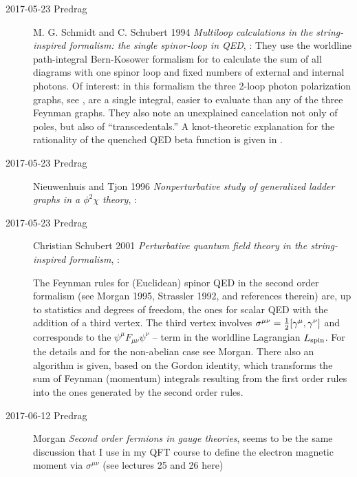\begin{description}
\item[2017-05-23 Predrag]
 \label{sect:SchSch96}
M. G. Schmidt and C. Schubert 1994
{\em Multiloop calculations in the string-inspired formalism: the single
spinor-loop in QED}, :
They use the worldline path-integral Bern-Kosower formalism
for to calculate the sum of all diagrams
with one spinor loop and fixed numbers of external and internal photons.
Of interest: in this formalism the three 2-loop photon polarization graphs,
see ,
are a single integral, easier to evaluate than any of the three Feynman
graphs. They also note an unexplained cancelation not only of poles, but also
of ``transcedentals.''
A knot-theoretic explanation for the rationality of the quenched
QED beta function is given in .

\item[2017-05-23 Predrag]
Nieuwenhuis and Tjon 1996
{\em Nonperturbative study of generalized ladder graphs in a {$\phi^2\chi$} theory},
:

\item[2017-05-23 Predrag]
Christian Schubert 2001
{\em Perturbative quantum field theory in the string-inspired formalism},
:

The Feynman rules for (Euclidean) spinor QED in the second order
formalism (see Morgan 1995,
Strassler 1992, and references therein) are, up to
statistics and degrees of freedom, the ones for scalar QED with the
addition of a third vertex. %
The third vertex involves
$\sigma^{\mu\nu}={1\over 2}[\gamma^{\mu},\gamma^{\nu}]$
and corresponds to the $\psi^{\mu}F_{\mu\nu}\psi^{\nu}$
-- term in the worldline Lagrangian $L_{\rm spin}$.
For the details and for the non-abelian case see Morgan.
There also an algorithm is given, based on the Gordon identity, which
transforms the sum of Feynman (momentum) integrals resulting from the
first order rules into the ones generated by the second order rules.

\item[2017-06-12 Predrag]
Morgan
{\em Second order fermions in gauge theories}, 
seems to be the same discussion that I use in my QFT course to define the
electron magnetic moment via $\sigma^{\mu\nu}$ (see lectures 25 and 26
{here})


\end{description}
